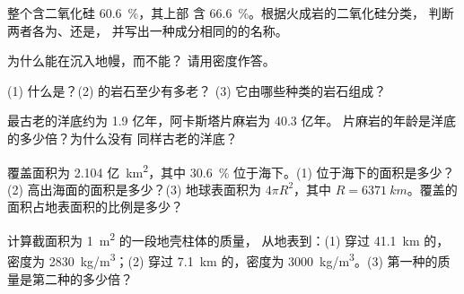 \begin{exercise}[$\star$]\label{exo:g12:continental-crust:2}
整个含二氧化硅 \qty{60.6}{\percent}，其上部
含 \qty{66.6}{\percent}。根据火成岩的二氧化硅分类，
判断两者各为、还是，
并写出一种成分相同的的名称。
\end{exercise}

\begin{exercise}[$\star$]\label{exo:g12:continental-crust:3}
为什么能在沉入地幔，而不能？
请用密度作答。
\end{exercise}

\begin{exercise}[$\star$]\label{exo:g12:continental-crust:4}
(1) 什么是？(2) 的岩石至少有多老？
(3) 它由哪些种类的岩石组成？
\end{exercise}

\begin{exercise}[$\star$]\label{exo:g12:continental-crust:5}
最古老的洋底约为 1.9 亿年，阿卡斯塔片麻岩为 40.3 亿年。
片麻岩的年龄是洋底的多少倍？为什么没有
同样古老的洋底？
\end{exercise}

\begin{exercise}[$\star\star$]\label{exo:g12:continental-crust:6}
覆盖面积为 2.104 亿~\unit{km^2}，其中
\qty{30.6}{\percent} 位于海下。(1) 位于海下的面积是多少？
(2) 高出海面的面积是多少？(3) 地球表面积为
$4\pi R^2$，其中 $R = \qty{6371}{km}$。覆盖的
面积占地表面积的比例是多少？
\end{exercise}

\begin{exercise}[$\star\star$]\label{exo:g12:continental-crust:7}
计算截面积为 \qty{1}{m^2} 的一段地壳柱体的质量，
从地表到：(1) 穿过 \qty{41.1}{km} 的，
密度为 \qty{2830}{kg/m^3}；(2) 穿过 \qty{7.1}{km} 的，密度为
\qty{3000}{kg/m^3}。(3) 第一种的质量是第二种的多少倍？
\end{exercise}

